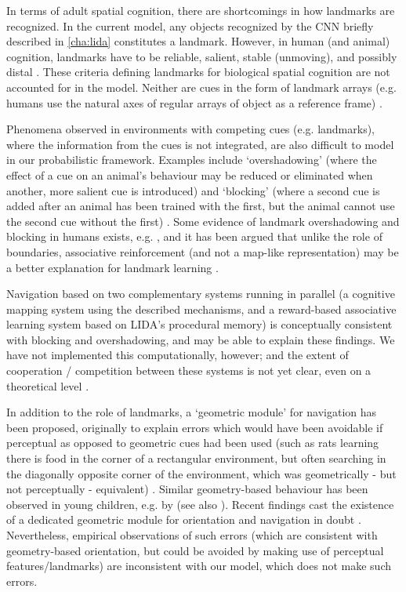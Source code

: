 In terms of adult spatial cognition, there are shortcomings in how landmarks are recognized. In the current model, any objects recognized by the CNN briefly described in \ref{cha:lida} constitutes a landmark. However, in human (and animal) cognition, landmarks have to be reliable, salient, stable (unmoving), and possibly distal \citep{lew2011looking}. These criteria defining landmarks for biological spatial cognition are not accounted for in the model. Neither are cues in the form of landmark arrays (e.g. humans use the natural axes of regular arrays of object as a reference frame) \citep{lew2011looking, burgess2006spatial}. 

Phenomena observed in environments with competing cues (e.g. landmarks), where the information from the cues is not integrated, are also difficult to model in our probabilistic framework. Examples include `overshadowing' (where the effect of a cue on an animal's behaviour may be reduced or eliminated when another, more salient cue is introduced) and `blocking' (where a second cue is added after an animal has been trained with the first, but the animal cannot use the second cue without the first) \citep{chamizo2003acquisition}. Some evidence of landmark overshadowing and blocking in humans exists, e.g. \citep{spetch1995overshadowing, prados2011blocking}, and it has been argued that unlike the role of boundaries, associative reinforcement (and not a map-like representation) may be a better explanation for landmark learning \citep{doeller2008distinct}. 

Navigation based on two complementary systems running in parallel (a cognitive mapping system using the described mechanisms, and a reward-based associative learning system based on LIDA's procedural memory) is conceptually consistent with blocking and overshadowing, and may be able to explain these findings. We have not implemented this computationally, however; and the extent of cooperation / competition between these systems is not yet clear, even on a theoretical level \citep{lew2011looking, cheng201325}.

In addition to the role of landmarks, a `geometric module' for navigation has been proposed, originally to explain errors which would have been avoidable if perceptual as opposed to geometric cues had been used (such as rats learning there is food in the corner of a rectangular environment, but often searching in the diagonally opposite corner of the environment, which was geometrically - but not perceptually - equivalent) \citep{cheng1986purely}. Similar geometry-based behaviour has been observed in young children, e.g. by \cite{huttenlocher1999spatial} (see also \citep{cheng201325}). Recent findings cast the existence of a dedicated geometric module for orientation and navigation in doubt \citep{cheng2008whither}. Nevertheless, empirical observations of such errors (which are consistent with geometry-based orientation, but could be avoided by making use of perceptual features/landmarks) are inconsistent with our model, which does not make such errors.

